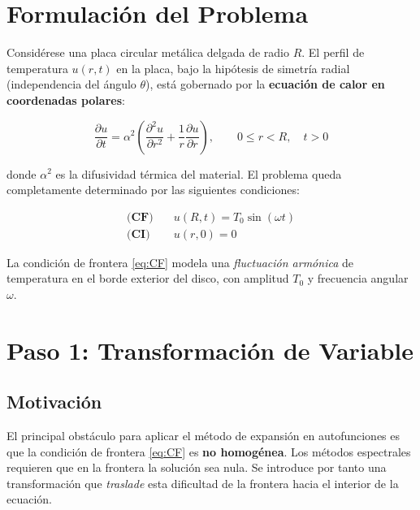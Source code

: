 \documentclass[12pt, a4paper]{article}
\newcommand{\pd}[2]{\dfrac{\partial #1}{\partial #2}}
\newcommand{\pdd}[2]{\dfrac{\partial^2 #1}{\partial #2^2}}
\begin{document}
\section{Formulación del Problema}

Considérese una placa circular metálica delgada de radio $R$. El perfil de temperatura
$u(r,t)$ en la placa, bajo la hipótesis de simetría radial (independencia del ángulo $\theta$),
está gobernado por la \textbf{ecuación de calor en coordenadas polares}:

\begin{equation}
  \pd{u}{t} = \alpha^2 \left( \pdd{u}{r} + \frac{1}{r}\pd{u}{r} \right),
  \qquad 0 \leq r < R,\quad t > 0
  \label{eq:calor_original}
\end{equation}

donde $\alpha^2$ es la difusividad térmica del material. El problema queda completamente
determinado por las siguientes condiciones:

\begin{align}
  \textbf{(CF)}\quad &u(R,t) = T_0 \sin(\omega t) \label{eq:CF}\\[4pt]
  \textbf{(CI)}\quad &u(r,0) = 0 \label{eq:CI}
\end{align}

La condición de frontera \eqref{eq:CF} modela una \textit{fluctuación armónica} de temperatura
en el borde exterior del disco, con amplitud $T_0$ y frecuencia angular $\omega$.


\section{Paso 1: Transformación de Variable}

\subsection{Motivación}

El principal obstáculo para aplicar el método de expansión en autofunciones es que la condición
de frontera \eqref{eq:CF} es \textbf{no homogénea}. Los métodos espectrales requieren que en
la frontera la solución sea nula. Se introduce por tanto una transformación que \emph{traslade}
esta dificultad de la frontera hacia el interior de la ecuación.
\end{document}
